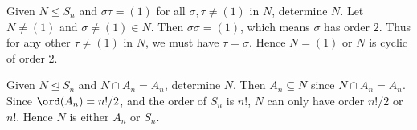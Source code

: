 \begin{problem}[Exercise 19]{
    Given $N \leq S_n$ and $\sigma\tau = (1)$ for all $\sigma,\tau \neq (1)$ in $N$, determine $N$.
}
    Let $N \neq (1)$ and $\sigma \neq (1) \in N$.
    Then $\sigma\sigma = (1)$, which means $\sigma$ has order $2$.
    Thus for any other $\tau \neq (1)$ in $N$, we must have $\tau = \sigma$.
    Hence $N = (1)$ or $N$ is cyclic of order $2$.
\end{problem}

\begin{problem}[Exercise 20]{
    Given $N \trianglelefteq S_n$ and $N \cap A_n = A_n$, determine $N$.
}
    Then $A_n \subseteq N$ since $N \cap A_n = A_n$.
    Since $\ord(A_n) = n!/2$, and the order of $S_n$ is $n!$, $N$ can only have order $n!/2$ or $n!$.
    Hence $N$ is either $A_n$ or $S_n$.
\end{problem}